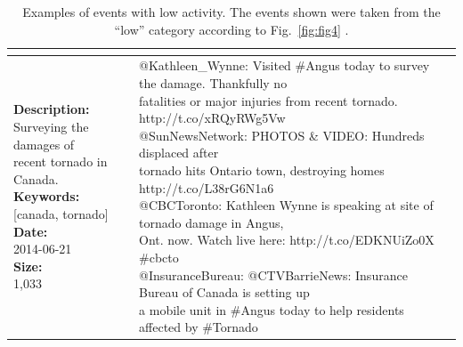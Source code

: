 \begin{table}[!htb]
{\begin{tabular*}{1\linewidth}{p{5cm}p{5cm}}
{        %
      }
      \\
            \midrule
      \pbox{20cm}{\textbf{Description:}\\Surveying the damages of \\ recent tornado in Canada. \vspace{.1cm}\\
        \textbf{Keywords:}\\ {[}canada, tornado{]}\vspace{.1cm}\\
        \textbf{Date:}\\ 2014-06-21 \vspace{.1cm}\\
        \textbf{Size:}\\ 1,033}
      & \pbox{20cm}{
        @Kathleen\_Wynne: Visited \#Angus today to survey the damage. Thankfully no \\fatalities or major injuries from recent tornado. http://t.co/xRQyRWg5Vw\vspace{.1cm}\\
        @SunNewsNetwork: PHOTOS \& VIDEO: Hundreds displaced after \\ tornado hits Ontario town, destroying homes http://t.co/L38rG6N1a6\vspace{.1cm}\\
        @CBCToronto: Kathleen Wynne is speaking at site of tornado damage in Angus, \\Ont. now. Watch live here: http://t.co/EDKNUiZo0X \#cbcto\vspace{.1cm}\\
        @InsuranceBureau: @CTVBarrieNews: Insurance Bureau of Canada is setting up \\a mobile unit in \#Angus today to help residents affected by \#Tornado}
      \\
      \bottomrule
    \end{tabular*}
  }
  \caption[Low-activity events examples]{{
                Examples of events with low activity. The events
      shown were taken from the ``low'' category according to
Fig.~\ref{fig:fig4}}
          .}
  \label{table:low-impact-sample}
\end{table}

